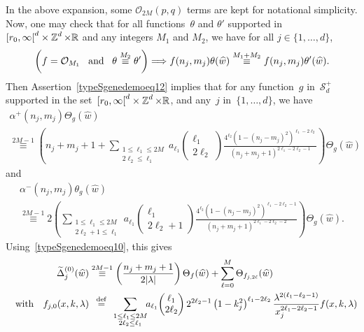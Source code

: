 \documentclass[AHL,Unicode,longabstracts]{cedram}
\newcommand*\sumetage[2]{\sum_{\substack{{#1}\\{#2}}}}
\let\wt=\widetilde
\let\wh=\widehat
\def\R{{\mathop{\mathbb R\kern 0pt}\nolimits}}
\def\ZZ{\mathop{\mathbb Z\kern 0pt}\nolimits}
\newcommand{\lam}{\lambda}
\newcommand{\D}{\Delta}
\newcommand{\wt}{\widetilde}
\newcommand{\wh}{\widehat}
\newcommand*\cO{\mathcal{O}}
\newcommand*\cS{\mathcal{S}}
\newcommand*\R{\mathbb{R}}
\newcommand*\ZZ{\mathbb{Z}}
\newcommand{\andf}{\quad\hbox{and}\quad}
\newcommand{\with}{\quad\hbox{with}\quad}
\newcommand*\eqdefa{\overset{\mathrm{def}}{=}}
\newcommand*\equivH[1]{\overset{#1}{\equiv}}
\begin{document}
In the above expansion, some $\cO_{2M}(p,q)$ terms are kept for notational simplicity. Now, one may check that for all functions~$\theta$ and $\theta'$ supported in~$[r_0,\infty\mathclose{[}^d\times \ZZ^d\times \R$ and any integers $M_1$ and $M_2$, we have for all $j\in\{1,\dots,d\}$,
\begin{equation}\label{typeSgenedemoeq10}
\left(f=\cO_{M_1} \!\andf \! \theta \equivH {M_2} \theta'\right) \Longrightarrow f(n_j,m_j) \theta(\wh w) \equivH {M_1+M_2} f(n_j,m_j) \theta'(\wh w).
\end{equation}
Then Assertion~\eqref{typeSgenedemoeq12} implies that for any function~$g $ in~$\cS_d^+$ supported in the set~$[r_0,\infty\mathclose{[}^d\times \ZZ^d\times \R$, and any~$j$ in~$\{1,\dots,d\}$, we have
\begin{multline}\label{eq:alpha+}
\alpha^+(n_j,m_j) \Theta_g(\wh w) \\
\equivH {2M-1} \left(n_j+m_j+1
+\sumetage {1\leq \ell_1\leq 2M} {2\ell_2\leq \ell_1} \! a_{\ell_1}
\begin{pmatrix} \ell_1 \\ 2\ell_2
\end{pmatrix} \frac {4^{\ell_2} (1-(n_j-m_j)^2)^{\ell_1-2\ell_2} } {(n_j+m_j+1)^{2\ell_1-2\ell_2-1}}\right) \Theta_g(\wh w)
\end{multline}
and
\begin{multline}\label{eq:alpha-}
\alpha^-(n_j,m_j) \theta_g(\wh w) \\ \equivH {2M-1} 2\left(\sumetage {1\leq \ell_1\leq 2M} {2\ell_2+1\leq \ell_1} \!a_{\ell_1}\!
\begin{pmatrix} \ell_1 \\ 2\ell_2\!+\!1
\end{pmatrix} \frac {4^{\ell_2}
\left(1-(n_j-m_j)^2\right)^{\ell_1-2\ell_2-1} } {(n_j\!+\!m_j\!+\!1)^{2\ell_1-2\ell_2-2}}\right) \Theta_g(\wh w).
\end{multline}
Using~\eqref{typeSgenedemoeq10}, this gives
\[
\begin{aligned}
\wt \D_j^{(0)} (\wh w) &\equivH{2M-1} \left(\frac {n_j+m_j+1} {2|\lam|}\right) \Theta_f(\wh w) +\sum_{\ell=0}^M \Theta_{f_{j,2\ell}}(\wh w) \\ \with
f_{j,0} (x,k,\lam) &\;\:\eqdefa\;\, \sumetage {1\leq \ell_1\leq 2M} {2\ell_2\leq \ell_1}\!\! a_{\ell_1}\!
\begin{pmatrix} \ell_1 \\ 2\ell_2
\end{pmatrix} 2^{2\ell_2-1} \left(1-k_j^2\right)^{\ell_1-2\ell_2} \frac { \lam^{2(\ell_1-\ell_2-1)}} {x_j^{2\ell_1-2\ell_2-1}} f(x,k,\lam)
\end{aligned}
\]
\end{document}
